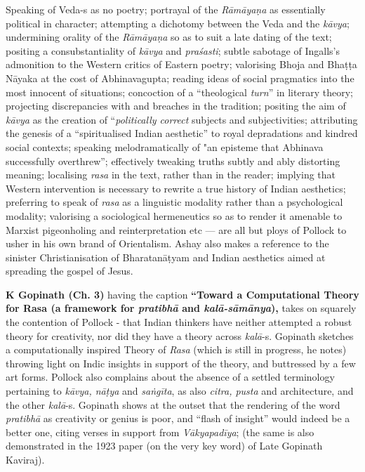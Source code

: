 Speaking of Veda-s as no poetry; portrayal of the \textsl{Rāmāyaṇa} as essentially political in character; attempting a dichotomy between the Veda and the \textsl{kāvya}; undermining orality of the \textsl{Rāmāyaṇa} so as to suit a late dating of the text; positing a consubstantiality of \textsl{kāvya} and \textsl{praśasti}; subtle sabotage of Ingalls's admonition to the Western critics of Eastern poetry; valorising Bhoja and Bhaṭṭa Nāyaka at the cost of Abhinavagupta; reading ideas of social pragmatics into the most innocent of situations; concoction of a “theological \textsl{turn}” in literary theory; projecting discrepancies with and breaches in the tradition; positing the aim of \textsl{kāvya} as the creation of “\textsl{politically correct} subjects and subjectivities; attributing the genesis of a “spiritualised Indian aesthetic” to royal depradations and kindred social contexts; speaking melodramatically of "an episteme that Abhinava successfully overthrew”; effectively tweaking truths subtly and ably distorting meaning; localising \textsl{rasa} in the text, rather than in the reader; implying that Western intervention is necessary to rewrite a true history of Indian aesthetics; preferring to speak of \textsl{rasa} as a linguistic modality rather than a psychological modality; valorising a sociological hermeneutics so as to render it amenable to Marxist pigeonholing and reinterpretation etc --- are all but ploys of Pollock to usher in his own brand of Orientalism. Ashay also makes a reference to the sinister Christianisation of Bharatanāṭyam and Indian aesthetics aimed at spreading the gospel of Jesus.

{\bf K Gopinath (Ch. 3)} having the caption {\bf “Toward a Computational Theory for Rasa (a framework for \textsl{pratibhā} and \textsl{kalā-sāmānya}),} takes on squarely the contention of Pollock - that Indian thinkers have neither attempted a robust theory for creativity, nor did they have a theory across \textsl{kalā}-s. Gopinath sketches a computationally inspired Theory of \textsl{Rasa} (which is still in progress, he notes) throwing light on Indic insights in support of the theory, and buttressed by a few art forms. Pollock also complains about the absence of a settled terminology pertaining to \textsl{kāvya, nāṭya} and \textsl{saṅgīta}, as also \textsl{citra, pusta} and architecture, and the other \textsl{kalā}-s. Gopinath shows at the outset that the rendering of the word \textsl{pratibhā} as creativity or genius is poor, and “flash of insight” would indeed be a better one, citing verses in support from \textsl{Vākyapadīya}; (the same is also demonstrated in the 1923 paper (on the very key word) of Late Gopinath Kaviraj).

